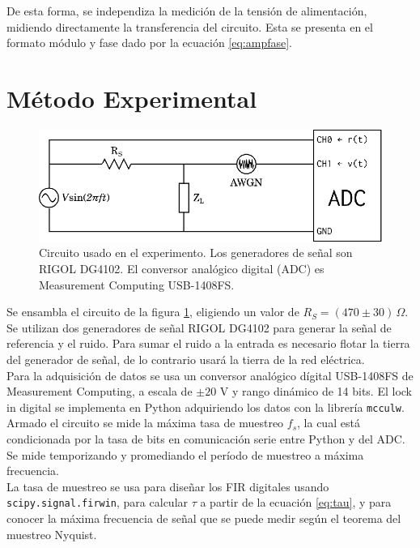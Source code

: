 \documentclass[11pt,a4paper]{extarticle}
\begin{document}
\begin{multicols}{2}
De esta forma, se independiza la medición de la tensión de alimentación, midiendo directamente la transferencia del circuito. 
Esta se presenta en el formato módulo y fase dado por la ecuación \ref{eq:ampfase}.

\section{Método Experimental}

\begin{figure}[H]
	\centering
	\includegraphics[width=\linewidth]{Images/circuito.eps}
	\caption{Circuito usado en el experimento. Los generadores de señal son RIGOL DG4102. El conversor analógico digital (ADC) es Measurement Computing USB-1408FS.}
	\label{fig:circuito}
\end{figure}

Se ensambla el circuito de la figura \ref{fig:circuito}, eligiendo un valor de $R_S = (470 \pm 30)\, \Omega$. 
Se utilizan dos generadores de señal RIGOL DG4102 
para generar la señal de referencia y el ruido.
Para sumar el ruido a la entrada es necesario flotar la 
tierra del generador de señal, de lo contrario usará la tierra de la red eléctrica.\\

Para la adquisición de datos se usa un conversor analógico dígital USB-1408FS de
Measurement Computing, a escala de $\pm 20$ V y rango dinámico de 14 bits. El lock in digital se implementa en Python adquiriendo los datos con la librería \texttt{mcculw}.\cite{mcculw}\\

Armado el circuito se mide la máxima tasa de muestreo $f_s$, la cual está condicionada por la tasa de bits en comunicación serie entre Python y del ADC.
Se mide temporizando y promediando el período de muestreo a máxima frecuencia.\\

La tasa de muestreo se usa para diseñar los FIR digitales usando \texttt{scipy.signal.firwin}, para calcular $\tau$ a partir de la ecuación \ref{eq:tau}, y para conocer la máxima frecuencia de señal que se puede medir según el teorema del muestreo Nyquist.\cite{haykin_4}\\



\end{multicols}
\end{document}
